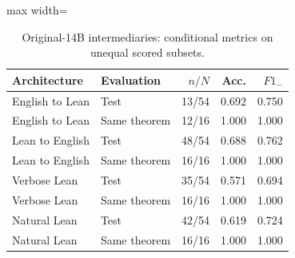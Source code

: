 \begin{table}[htbp]
\centering
\caption{Original-14B intermediaries: conditional metrics on unequal scored subsets.}
\label{tab:compact-intermediaries}
\small
\begin{adjustbox}{max width=\textwidth}
\begin{tabular}{llrrr}
\toprule
Architecture & Evaluation & $n/N$ & Acc. & $F1_-$ \\
\midrule
English to Lean & Test & 13/54 & 0.692 & 0.750 \\
English to Lean & Same theorem & 12/16 & 1.000 & 1.000 \\
Lean to English & Test & 48/54 & 0.688 & 0.762 \\
Lean to English & Same theorem & 16/16 & 1.000 & 1.000 \\
Verbose Lean & Test & 35/54 & 0.571 & 0.694 \\
Verbose Lean & Same theorem & 16/16 & 1.000 & 1.000 \\
Natural Lean & Test & 42/54 & 0.619 & 0.724 \\
Natural Lean & Same theorem & 16/16 & 1.000 & 1.000 \\
\bottomrule
\end{tabular}
\end{adjustbox}
\end{table}
